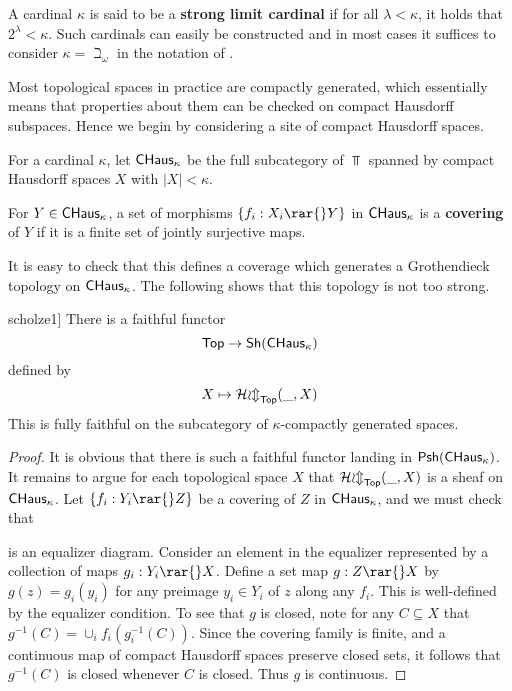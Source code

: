\documentclass[./main.tex]{subfiles}
\begin{document}
\begin{definition}
A cardinal $\kappa$ is said to be a \textbf{strong limit cardinal} if for all $\lambda < \kappa$, it holds that $2^\lambda < \kappa$. Such cardinals can easily be constructed and in most cases it suffices to consider $\kappa = \beth_\omega$ in the notation of \cite[Remark 1.3]{scholze1}.
\end{definition}

Most topological spaces in practice are compactly generated, which essentially means that properties about them can be checked on compact Hausdorff subspaces. Hence we begin by considering a site of compact Hausdorff spaces. 

\begin{definition}
For a cardinal $\kappa$, let $\mathsf{CHaus}_\kappa$ be the full subcategory of $\Top$ spanned by compact Hausdorff spaces $X$ with $|X| < \kappa$. 
\end{definition}

\begin{definition}\label{covering}
For $Y \in \mathsf{CHaus}_\kappa$, a set of morphisms $\{f_i : X_i \rar{} Y\}$ in $\mathsf{CHaus}_\kappa$ is a \textbf{covering} of $Y$ if it is a finite set of jointly surjective maps. 
\end{definition}

It is easy to check that this defines a coverage which generates a Grothendieck topology on $\mathsf{CHaus}_\kappa$. The following shows that this topology is not too strong.

\begin{proposition}[\cite[Proposition 1.7]{scholze1}]
There is a faithful functor
$$\mathsf{Top} \rightarrow \mathsf{Sh}(\mathsf{CHaus}_\kappa)$$
defined by
$$X \mapsto \mathcal{Hom}_{\mathsf{Top}}(\_,X)$$
This is fully faithful on the subcategory of $\kappa$-compactly generated spaces. 
\end{proposition}
\begin{proof}
It is obvious that there is such a faithful functor landing in $\mathsf{Psh}(\mathsf{CHaus}_\kappa)$. It remains to argue for each topological space $X$ that $\mathcal{Hom}_{\mathsf{Top}}(\_,X)$ is a sheaf on $\mathsf{CHaus}_\kappa$. Let $\{f_i : Y_i \rar{} Z\}$ be a covering of $Z$ in $\mathsf{CHaus}_\kappa$, and we must check that
\begin{center}
\end{center}
is an equalizer diagram. Consider an element in the equalizer represented by a collection of maps $g_i : Y_i \rar{} X$. Define a set map $g : Z \rar{} X$ by $g(z) = g_i(y_i)$ for any preimage $y_i \in Y_i$ of $z$ along any $f_i$. This is well-defined by the equalizer condition. To see that $g$ is closed, note for any $C \subseteq X$ that $g^{-1}(C) = \cup_i f_i(g_i^{-1}(C))$. Since the covering family is finite, and a continuous map of compact Hausdorff spaces preserve closed sets, it follows that $g^{-1}(C)$ is closed whenever $C$ is closed. Thus $g$ is continuous. 
\end{proof}
\end{document}
